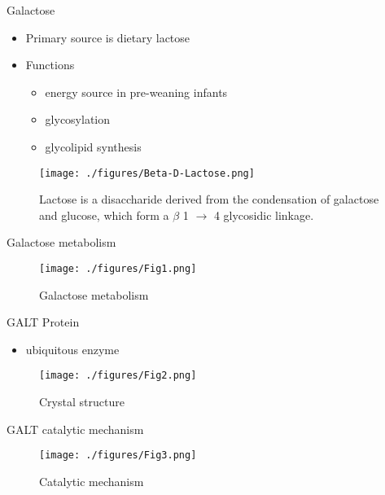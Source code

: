 \documentclass[presentation, smaller]{beamer}
\begin{document}
\begin{frame}[label={sec:org6a6f4f5}]{Galactose}
\begin{itemize}
\item Primary source is dietary lactose
\item Functions
\begin{itemize}
\item energy source in pre-weaning infants
\item glycosylation
\item glycolipid synthesis
\end{itemize}
\end{itemize}


\begin{figure}[htbp]
\centering
\texttt{[image: ./figures/Beta-D-Lactose.png]}
\caption[lactose]{\label{fig:org98f0f30}
Lactose is a disaccharide derived from the condensation of galactose and glucose, which form a \(\beta\) 1 \(\to\) 4 glycosidic linkage.}
\end{figure}
\end{frame}


\begin{frame}[label={sec:org1bf2c01}]{Galactose metabolism}
\begin{figure}[htbp]
\centering
\texttt{[image: ./figures/Fig1.png]}
\caption[met]{\label{fig:org300f288}
Galactose metabolism}
\end{figure}
\end{frame}


\begin{frame}[label={sec:orgcdcfee9}]{GALT Protein}
\begin{itemize}
\item ubiquitous enzyme
\end{itemize}

\begin{figure}[htbp]
\centering
\texttt{[image: ./figures/Fig2.png]}
\caption[structure]{\label{fig:org3147b9a}
Crystal structure}
\end{figure}
\end{frame}


\begin{frame}[label={sec:orgf425d4b}]{GALT catalytic mechanism}
\begin{figure}[htbp]
\centering
\texttt{[image: ./figures/Fig3.png]}
\caption[mechanism]{\label{fig:orgaf5d42f}
Catalytic mechanism}
\end{figure}
\end{frame}
\end{document}

